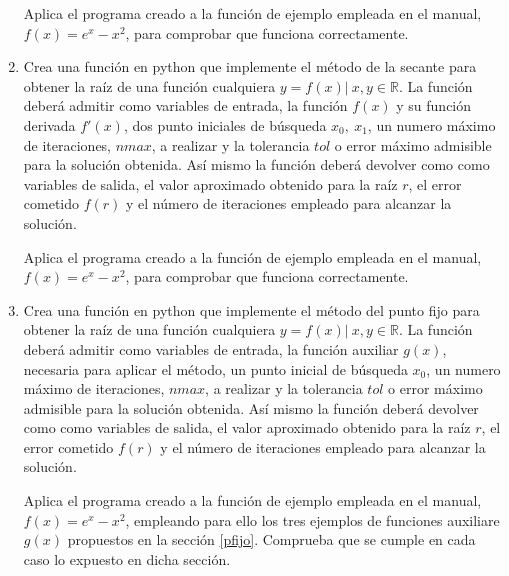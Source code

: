 \begin{enumerate}
Aplica el programa creado a la función de ejemplo empleada en el manual, $f(x) = e^x-x^2$, para comprobar que funciona correctamente.

\item Crea una función en python que implemente el método de la secante para obtener la raíz de una función cualquiera $y = f(x)\vert\  x, y \in \mathbb{R}$. La función deberá admitir como variables de entrada, la función $f(x)$ y su función derivada $f'(x)$, dos punto iniciales de búsqueda $x_0,\ x_1$, un numero máximo de iteraciones, $nmax$, a realizar y la tolerancia $tol$ o error máximo admisible para la solución obtenida. Así mismo la función deberá devolver como como variables de salida, el valor aproximado obtenido para la raíz $r$, el error cometido $f(r)$ y el número de iteraciones empleado para alcanzar la solución.

Aplica el programa creado a la función de ejemplo empleada en el manual, $f(x) = e^x-x^2$, para comprobar que funciona correctamente.

\item Crea una función en python que implemente el método del punto fijo para obtener la raíz de una función cualquiera $y = f(x)\vert\  x, y \in \mathbb{R}$. La función deberá admitir como variables de entrada, la función auxiliar $g(x)$, necesaria para aplicar el método, un punto inicial de búsqueda $x_0$, un numero máximo de iteraciones, $nmax$, a realizar y la tolerancia $tol$ o error máximo admisible para la solución obtenida. Así mismo la función deberá devolver como como variables de salida, el valor aproximado obtenido para la raíz $r$, el error cometido $f(r)$ y el número de iteraciones empleado para alcanzar la solución.

Aplica el programa creado a la función de ejemplo empleada en el manual, $f(x) = e^x-x^2$, empleando para ello los tres ejemplos de funciones auxiliare $g(x)$ propuestos en la sección \ref{pfijo}. Comprueba que se cumple en cada caso lo expuesto en dicha sección.


\end{enumerate}
